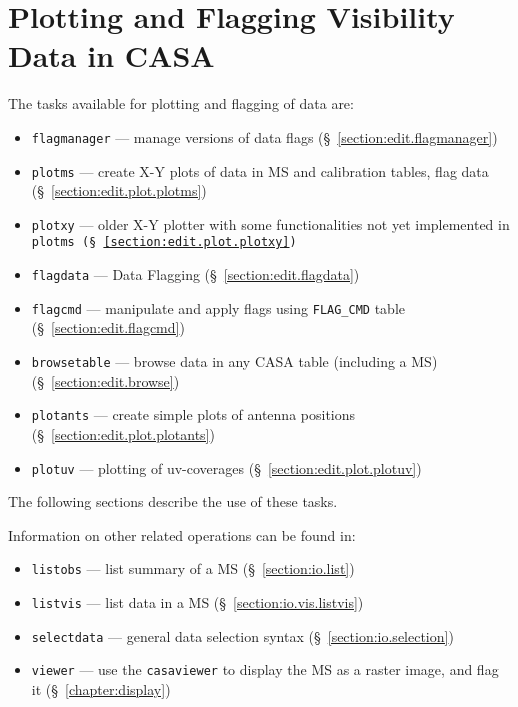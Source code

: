 \section{Plotting and Flagging Visibility Data in CASA}
\label{section:edit.intro}

The tasks available for plotting and flagging of data are:
\begin{itemize}
   \item {\tt flagmanager} --- manage versions of data flags
      (\S~\ref{section:edit.flagmanager})
   \item {\tt plotms} --- create X-Y plots of data in MS and
     calibration tables, flag data
      (\S~\ref{section:edit.plot.plotms})
   \item {\tt plotxy} --- older X-Y plotter with some functionalities not yet implemented in \tt{plotms}
      (\S~\ref{section:edit.plot.plotxy})
    \item {\tt flagdata} --- Data Flagging 
      (\S~\ref{section:edit.flagdata})
   \item {\tt flagcmd} --- manipulate and apply flags using {\tt FLAG\_CMD} table
      (\S~\ref{section:edit.flagcmd})
  \item {\tt browsetable} --- browse data in any CASA table (including a MS)
      (\S~\ref{section:edit.browse})
   \item {\tt plotants} --- create simple plots of antenna positions
      (\S~\ref{section:edit.plot.plotants})
  \item {\tt plotuv} --- plotting of uv-coverages
      (\S~\ref{section:edit.plot.plotuv})
\end{itemize}

The following sections describe the use of these tasks.

Information on other related operations can be found in:
\begin{itemize}
   \item {\tt listobs} --- list summary of a MS (\S~\ref{section:io.list})
   \item {\tt listvis} --- list data in a MS (\S~\ref{section:io.vis.listvis})
   \item {\tt selectdata} --- general data selection syntax
      (\S~\ref{section:io.selection})
   \item {\tt viewer} --- use the {\tt casaviewer} to display the MS as a 
      raster image, and flag it (\S~\ref{chapter:display})

\end{itemize}

